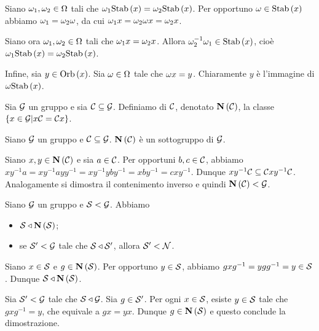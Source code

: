 \Proof Siano $\omega_1, \omega_2 \in \Omega$ tali che $\Coset{\Operator_1}{\Stabilizer{x}} = \Coset{\Operator_2}{\Stabilizer{x}}$. Per opportuno $\Operator \in \Stabilizer{x}$ abbiamo $\omega_1 = \omega_2\omega$, da cui $\omega_1 x = \omega_2\omega x = \omega_2 x$.
\par Siano ora $\omega_1, \omega_2 \in \Omega$ tali che $\omega_1 x = \omega_2 x$. Allora $\Operator_2^{-1}\Operator_1 \in \Stabilizer{x}$, cio\`e $\Coset{\Operator_1}{\Stabilizer{x}} = \Coset{\Operator_2}{\Stabilizer{x}}$.
\par Infine, sia $y \in \Orbit{x}$. Sia $\omega \in \Omega$ tale che $\omega x = y$. Chiaramente $y$ \`e l'immagine di $\Coset{\Operator}{\Stabilizer{x}}$.\EndProof
\begin{Definition}
	Sia $\mathcal{G}$ un gruppo e sia
	$\mathcal{C} \subseteq \mathcal{G}$. Definiamo
	 di $\mathcal{C}$,
	denotato $\textbf{N} \left ( \mathcal{C} \right )$, la classe
	$\lbrace x \in \mathcal{G} | x\mathcal{C} = \mathcal{C} x \rbrace$.
\end{Definition}
\begin{Theorem}
	Siano $\mathcal{G}$ un gruppo e $\mathcal{C} \subseteq \mathcal{G}$.
	$\textbf{N} \left ( \mathcal{C} \right )$ \`e un sottogruppo di $\mathcal{G}$.
\end{Theorem}
\Proof
Siano $x, y \in \textbf{N} \left ( \mathcal{C} \right )$ e sia
$a \in \mathcal{C}$.
Per opportuni $b, c \in \mathcal{C}$, abbiamo
$xy^{-1}a =
xy^{-1}ayy^{-1} =
xy^{-1}yby^{-1} =
xby^{-1} =
cxy^{-1}$.
Dunque $xy^{-1}\mathcal{C} \subseteq \mathcal{C} xy^{-1}\mathcal{C}$.
Analogamente si dimostra il contenimento inverso e quindi
$\textbf{N} \left ( \mathcal{C} \right ) < \mathcal{G}$.
\EndProof
\begin{Theorem}
	Siano $\mathcal{G}$ un gruppo e
	$\mathcal{S} < \mathcal{G}$.
	Abbiamo
	\begin{itemize}
		\item
		$\mathcal{S} \triangleleft
		\textbf{N} \left ( \mathcal{S} \right )$;
		\item
		se $\mathcal{S}' < \mathcal{G}$
		tale che $\mathcal{S} \triangleleft \mathcal{S}'$,
		allora $\mathcal{S}' < \mathcal{N}$.
	\end{itemize}
\end{Theorem}
\Proof
Siano $x \in \mathcal{S}$ e
$g \in \textbf{N} \left ( \mathcal{S} \right )$.
Per opportuno $y \in \mathcal{S}$, abbiamo
$gxg^{-1} =
ygg^{-1} = y \in \mathcal{S}$.
Dunque $\mathcal{S} \triangleleft \textbf{N} \left ( \mathcal{S} \right )$.
\par
Sia $\mathcal{S}' < \mathcal{G}$ tale che
$\mathcal{S} \triangleleft \mathcal{G}$.
Sia $g \in \mathcal{S}'$. Per ogni $x \in \mathcal{S}$, esiste
$y \in \mathcal{S}$ tale che $gxg^{-1} = y$, che equivale a
$gx = yx$. Dunque $g \in \textbf{N} \left ( \mathcal{S} \right )$ e questo
conclude la dimostrazione.
\EndProof

